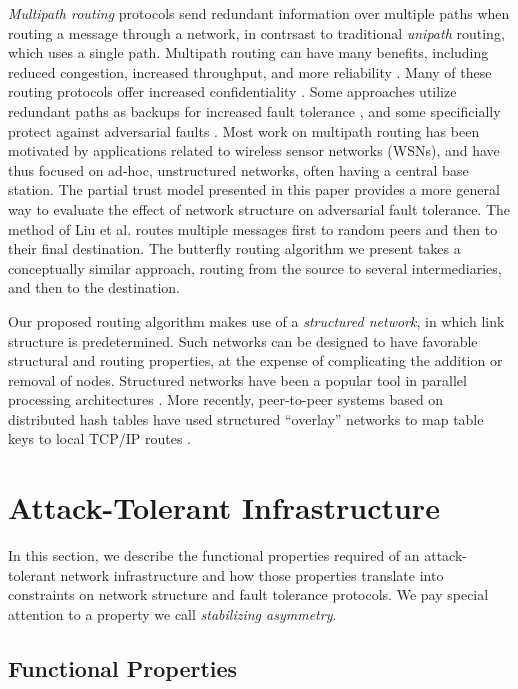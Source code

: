 \documentclass{sig-alternate-05-2015}
\begin{document}
{\em Multipath routing} protocols send redundant information
over multiple paths when routing a message through a network,
in contrsast to traditional {\em unipath} routing, which uses
a single path.
Multipath routing can have many benefits, including reduced congestion,
increased throughput, and more reliability
\cite{qadir_exploiting_2015}.
Many of these routing protocols offer increased confidentiality
\cite{zin_survey_2015}.
Some approaches utilize redundant paths as backups for increased
fault tolerance
\cite{alrajeh_secure_2013},
and some specificially protect against adversarial faults
\cite{kohno_improvement_2012, khalil_unmask:_2010, lou_h-spread:_2006}.
Most work on multipath routing has been motivated by applications related to
wireless sensor networks (WSNs),
and have thus focused on ad-hoc, unstructured networks, often having a central
base station.
The partial trust model presented in this paper provides a more general
way to evaluate the effect of network structure on adversarial fault tolerance.
The method of Liu et al.
\cite{liu_secure_2012}
routes multiple messages first to random peers and then
to their final destination.
The butterfly routing algorithm we present takes a conceptually similar
approach,
routing from the source to several intermediaries, and then to the destination.

Our proposed routing algorithm makes use of a
{\em structured network}, in which link structure is predetermined.
Such networks can be designed to have favorable structural and routing
properties,
at the expense of complicating the addition or removal of nodes.
Structured networks have been a popular tool in parallel processing
architectures \cite{kshemkalyani_distributed_2008}.
More recently, peer-to-peer systems based on distributed hash tables have used
structured ``overlay'' networks to map table keys to local TCP/IP routes
\cite{lua_survey_2005,korzun_structured_2013}.

\section{Attack-Tolerant Infrastructure}

In this section, we describe the functional properties required of an
attack-tolerant network infrastructure and how those properties translate
into constraints on network structure and fault tolerance protocols.
We pay special attention to a property we call
{\em stabilizing asymmetry}.

\subsection{Functional Properties}
\end{document}
